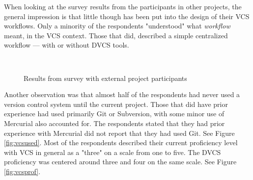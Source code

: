 \documentclass{llncs}
\begin{document}
When looking at the survey results from the participants in other
projects, the general impression is that little though has been put
into the design of their VCS workflows. Only a minority of the
respondents "understood" what \emph{workflow} meant, in the VCS
context. Those that did, described a simple centralized workflow ---
with or without DVCS tools. 

\begin{figure}
 \begin{center}
 \\
 \caption{Results from survey with external project participants}
 \end{center}
\end{figure}

Another observation was that almost half of the respondents had never
used a version control system until the current project. Those that
did have prior experience had used primarily Git or Subversion, with
some minor use of Mercurial also accounted for. The respondents
stated that they had prior experience with Mercurial did not report
that they had used Git. See Figure \ref{fig:vcsused}. Most of the
respondents described their current proficiency level with VCS in
general as a "three" on a scale from one to five. The DVCS proficiency
was centered around three and four on the same scale. See Figure
\ref{fig:vcsprof}.
\end{document}
